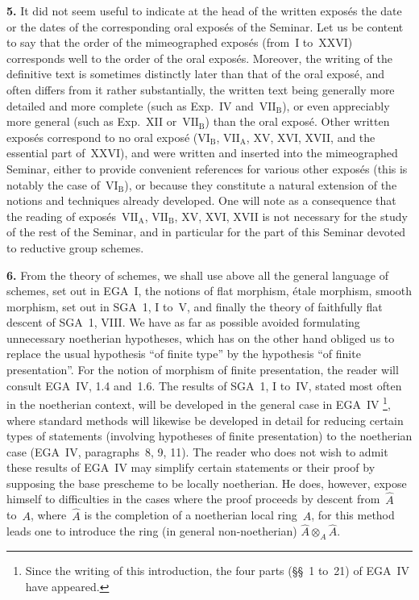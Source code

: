 \par{}
\noindent\textbf{5.}\label{Intro.sec.5}
It did not seem useful to indicate at the head of the written expos\'es the
date or the dates of the corresponding oral expos\'es of the Seminar. Let us
be content to say that the order of the mimeographed expos\'es (from~I
to~XXVI) corresponds well to the order of the oral expos\'es. Moreover, the
writing of the definitive text is sometimes distinctly later than that of
the oral expos\'e, and often differs from it rather substantially, the
written text being generally more detailed and more complete (such as
Exp.~IV and~$\mathrm{VII}_{\mathrm{B}}$), or even appreciably more general
(such as Exp.~XII or~$\mathrm{VII}_{\mathrm{B}}$) than the oral expos\'e.
Other written expos\'es correspond to no oral expos\'e
($\mathrm{VI}_{\mathrm{B}}$, $\mathrm{VII}_{\mathrm{A}}$, XV, XVI, XVII, and
the essential part of~XXVI), and were written and inserted into the
mimeographed Seminar, either to provide convenient references for various
other expos\'es (this is notably the case of~$\mathrm{VI}_{\mathrm{B}}$), or
because they constitute a natural extension of the notions and techniques
already developed. One will note as a consequence that the reading of
expos\'es~$\mathrm{VII}_{\mathrm{A}}$, $\mathrm{VII}_{\mathrm{B}}$, XV, XVI,
XVII is not necessary for the study of the rest of the Seminar, and in
particular for the part of this Seminar devoted to reductive group schemes.

\par{}
\noindent\textbf{6.}\label{Intro.sec.6}
From the theory of schemes, we shall use above all the general language of
schemes, set out in EGA~I, the notions of flat morphism, \'etale morphism,
smooth morphism, set out in SGA~1, I to~V, and finally the theory of
faithfully flat descent of SGA~1, VIII. We have as far as possible avoided
formulating unnecessary noetherian hypotheses, which has on the other hand
obliged us to replace the usual hypothesis ``of finite type'' by the
hypothesis ``of finite presentation''. For the notion of morphism of finite
presentation, the reader will consult EGA~IV, 1.4 and~1.6. The results of
SGA~1, I to~IV, stated most often in the noetherian context, will be
developed in the general case in EGA~IV%
{\renewcommand{\thefootnote}{(****)}\footnote{Since the writing of this
introduction, the four parts (\S\S~1 to~21) of EGA~IV have appeared.}},
where standard methods will likewise be developed in detail for reducing
certain types of statements (involving hypotheses of finite presentation) to
the noetherian case (EGA~IV, paragraphs~8, 9, 11). The reader who does not
wish to admit these results of EGA~IV may simplify certain statements or
their proof by supposing the base prescheme to be locally noetherian. He
does, however, expose himself to difficulties in the cases where the proof
proceeds by descent from~$\widehat{A}$ to~$A$, where~$\widehat{A}$ is the
completion of a noetherian local ring~$A$, for this method leads one to
introduce the ring (in general non-noetherian)
\(\widehat{A}\otimes_{A}\widehat{A}\).


